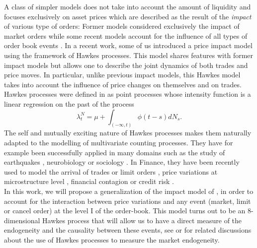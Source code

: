 \documentclass[a4paper,11pt]{article}
\begin{document}
\noindent A class of simpler models does not take into account the amount of liquidity and focuses exclusively on asset prices which are described as the result
of the {\em impact} of various type of orders: Former models considered exclusively the impact of market orders \cite{bouchaud2009markets,bouchaud2004fluctuations,jaisson2014market} while some recent models account for the influence of all types of order book events \cite{cont2013price,eisler2012price}. In a recent work, some of us \cite{bacry2014hawkes} introduced a price impact model using the framework of Hawkes processes. This model shares features with former impact models but allows one to describe the joint dynamics of both
trades and price moves. In particular, unlike previous impact models, 
this Hawkes model takes into account the influence of price changes on themselves and on trades.\\


\noindent Hawkes processes were defined in \cite{hawkes1971point} as point processes whose intensity function is a linear regression on the past of the process
$$\lambda^N_t=\mu+\int_{(-\infty,t)} \phi(t-s)dN_s.$$
The self and mutually exciting nature of Hawkes processes makes them naturally adapted to the modelling of multivariate counting processes. They have for example been successfully applied in many domains such as the study of earthquakes \cite{ogata1999seismicity}, neurobiology \cite{reynaud2014goodness} or sociology \cite{mohler2011self}.
In Finance, they have been recently used to model the arrival of trades or limit orders \cite{hewlett2006clustering,bowsher2007modelling,large2007measuring}, price variations at microstructure level \cite{bacry2013modelling,bacry2014hawkes,hardiman2013critical}, financial contagion \cite{ait2010modeling} or credit risk \cite{errais2010affine}.\\

\noindent In this work, we will propose a generalization of the impact model of \cite{bacry2014hawkes}, in order to account for the interaction between price variations and any event (market, limit or cancel order)
at the level I of the order-book. This model turns out to be
an 8-dimensional Hawkes process that will allow us to have a direct measure of the endogeneity and the causality between these events, see \cite{filimonov2012quantifying} or \cite{hardiman2013critical} for related discussions about the use of Hawkes processes to measure the market endogeneity.\\
\end{document}
